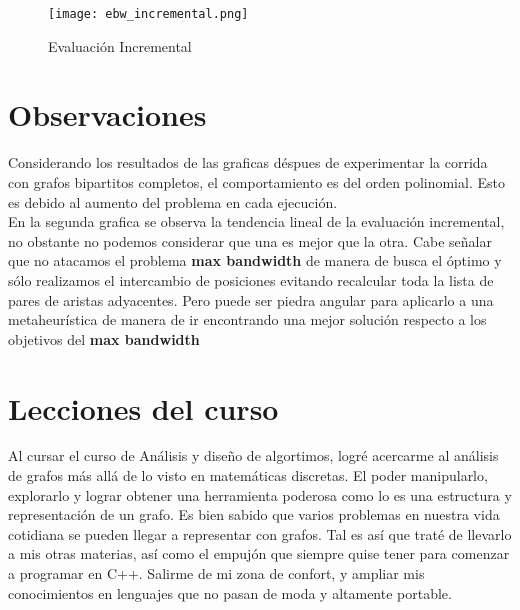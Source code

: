 \documentclass[
	letterpaper, %
	10pt, %
]{CSUniSchoolLabReport}
\begin{document}
\begin{figure}[H] %
	\centering %
	\texttt{[image: ebw\_incremental.png]} %
	\caption{Evaluación Incremental}
\end{figure}


\section{Observaciones}

Considerando los resultados de las graficas déspues de experimentar la corrida con grafos bipartitos completos, el comportamiento es del orden polinomial. Esto es debido al aumento del problema en cada ejecución.\\

En la segunda grafica se observa la tendencia lineal de la evaluación incremental, no obstante no podemos considerar que una es mejor que la otra. Cabe señalar que no atacamos el problema \textbf{max bandwidth} de manera de busca el óptimo y sólo realizamos el intercambio de posiciones evitando recalcular toda la lista de pares de aristas adyacentes. Pero puede ser piedra angular para aplicarlo a una metaheurística de manera de ir encontrando una mejor solución respecto a los objetivos del \textbf{max bandwidth}


\section{Lecciones del curso}

Al cursar el curso de Análisis y diseño de algortimos, logré acercarme al análisis de grafos más allá de lo visto en matemáticas discretas. El poder manipularlo, explorarlo y lograr obtener una herramienta poderosa como lo es una estructura y representación de un grafo. Es bien sabido que varios problemas en nuestra vida cotidiana se pueden llegar a representar con grafos. Tal es así que traté de llevarlo a mis otras materias, así como el empujón que siempre quise tener para comenzar a programar en C++. Salirme de mi zona de confort, y ampliar mis conocimientos en lenguajes que no pasan de moda y altamente portable.\\
\end{document}
